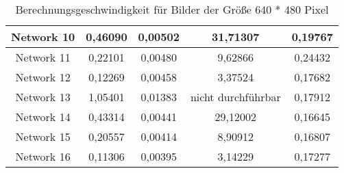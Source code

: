 \begin{table}[H]
\begin{tabular}{ |c|c|c|c|c| }
        Network 10 & 0,46090                                & 0,00502                                & 31,71307                               & 0,19767                                \\ \hline
        Network 11 & 0,22101                                & 0,00480                                & 9,62866                                & 0,24432                                \\ \hline
        Network 12 & 0,12269                                & 0,00458                                & 3,37524                                & 0,17682                                \\ \hline
        Network 13 & 1,05401                                & 0,01383                                & \textcolor{danger}{nicht durchführbar} & 0,17912                                \\ \hline
        Network 14 & 0,43314                                & 0,00441                                & 29,12002                               & 0,16645                                \\ \hline
        Network 15 & 0,20557                                & 0,00414                                & 8,90912                                & 0,16807                                \\ \hline
        Network 16 & 0,11306                                & 0,00395                                & 3,14229                                & 0,17277                                \\ \hline
    \end{tabular}
    \caption{Berechnungsgeschwindigkeit für Bilder der Größe 640 * 480 Pixel}
    \label{tab:640x480}
\end{table}










